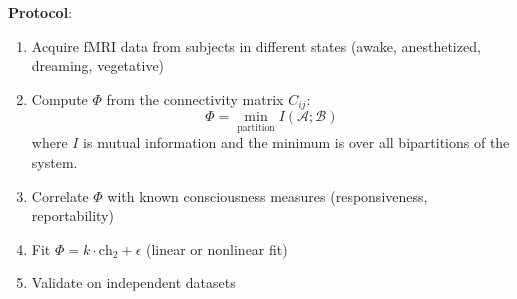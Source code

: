 \textbf{Protocol}:
\begin{enumerate}
\item Acquire fMRI data from subjects in different states (awake, anesthetized, dreaming, vegetative)
\item Compute $\Phi$ from the connectivity matrix $C_{ij}$:
\begin{equation}
\Phi = \min_{\text{partition}} I(\mathcal{A}; \mathcal{B})
\end{equation}
where $I$ is mutual information and the minimum is over all bipartitions of the system.

\item Correlate $\Phi$ with known consciousness measures (responsiveness, reportability)
\item Fit $\Phi = k \cdot \text{ch}_2 + \epsilon$ (linear or nonlinear fit)
\item Validate on independent datasets
\end{enumerate}

